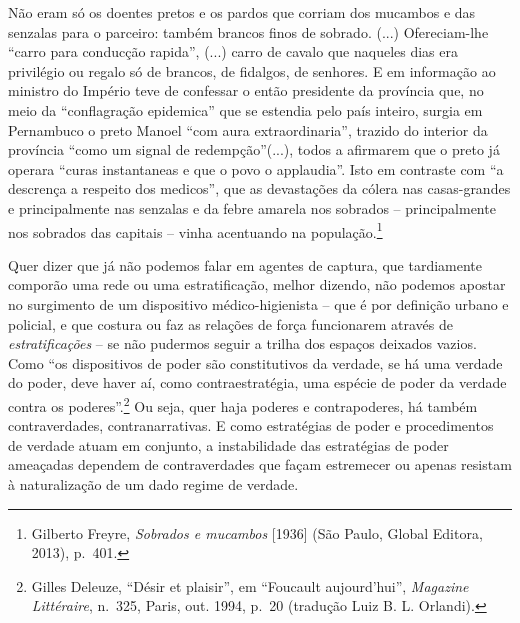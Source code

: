 Não eram só os doentes pretos e os pardos que corriam dos mucambos e das
senzalas para o parceiro: também brancos finos de sobrado. (...)
Ofereciam-lhe ``carro para conducção rapida'', (...) carro de cavalo que
naqueles dias era privilégio ou regalo só de brancos, de fidalgos, de
senhores. E em informação ao ministro do Império teve de confessar o
então presidente da província que, no meio da ``conflagração epidemica''
que se estendia pelo país inteiro, surgia em Pernambuco o preto Manoel
``com aura extraordinaria'', trazido do interior da província ``como um
signal de redempção''(...), todos a afirmarem que o preto já operara
``curas instantaneas e que o povo o applaudia''. Isto em contraste com
``a descrença a respeito dos medicos'', que as devastações da cólera nas
casas-grandes e principalmente nas senzalas e da febre amarela nos
sobrados -- principalmente nos sobrados das capitais -- vinha acentuando
na população.\footnote{Gilberto Freyre, \emph{Sobrados e mucambos}
  {[}1936{]} (São Paulo, Global Editora, 2013), p.~401.}

Quer dizer que já não podemos falar em agentes de captura, que
tardiamente comporão uma rede ou uma estratificação, melhor dizendo, não
podemos apostar no surgimento de um dispositivo médico-higienista -- que
é por definição urbano e policial, e que costura ou faz as relações de
força funcionarem através de \emph{estratificações} -- se não pudermos
seguir a trilha dos espaços deixados vazios. Como ``os dispositivos de
poder são constitutivos da verdade, se há uma verdade do poder, deve
haver aí, como contraestratégia, uma espécie de poder da verdade contra
os poderes''.\footnote{Gilles Deleuze, ``Désir et plaisir'', em
  ``Foucault aujourd'hui'', \emph{Magazine Littéraire}, n.~325, Paris,
  out. 1994, p.~20 (tradução Luiz B. L. Orlandi).} Ou seja, quer haja
poderes e contrapoderes, há também contraverdades, contranarrativas. E
como estratégias de poder e procedimentos de verdade atuam em conjunto,
a instabilidade das estratégias de poder ameaçadas dependem de
contraverdades que façam estremecer ou apenas resistam à naturalização
de um dado regime de verdade.


